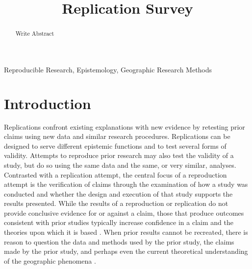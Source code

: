 \documentclass[]{interact}
\theoremstyle{plain}%
\theoremstyle{definition}
\theoremstyle{remark}
\begin{document}

\title{Replication Survey}

\author{
}

\maketitle

\begin{abstract}
Write Abstract

\end{abstract}

\begin{keywords}
Reproducible Research, Epistemology, Geographic Research Methods
\end{keywords}

\newpage
\section*{Introduction}
Replications confront existing explanations with new evidence by retesting prior claims using new data and similar research procedures.
Replications can be designed to serve different epistemic functions and to test several forms of validity.
Attempts to reproduce prior research may also test the validity of a study, but do so using the same data and the same, or very similar, analyses. 
Contrasted with a replication attempt, the central focus of a reproduction attempt is the verification of claims through the examination of how a study was conducted and whether the design and execution of that study supports the results presented.
While the results of a reproduction or replication do not provide conclusive evidence for or against a claim, those that produce outcomes consistent with prior studies typically increase confidence in a claim and the theories upon which it is based \citep{earp2015, nichols2021}. 
When prior results cannot be recreated, there is reason to question the data and methods used by the prior study, the claims made by the prior study, and perhaps even the current theoretical understanding of the geographic phenomena \citep{christensen2019, NASEM2019}.
\end{document}
